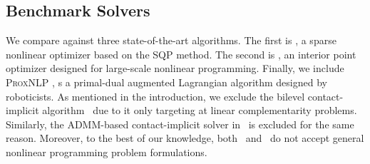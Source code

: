 \subsection{Benchmark Solvers}
We compare  against three state-of-the-art algorithms.
The first is \snopt \cite{SNOPT}, a sparse nonlinear optimizer based on the SQP method. The second is \ipopt \cite{ipopt}, an interior point optimizer designed for large-scale nonlinear programming. Finally, we include \textsc{ProxNLP} \cite{proxNLP}, s a primal-dual augmented Lagrangian algorithm designed by roboticists. As mentioned in the introduction, we exclude the bilevel contact-implicit algorithm~\cite{le2024fast} due to it only targeting at linear complementarity problems. Similarly, the ADMM-based contact-implicit solver in~\cite{aydinoglu2024consensus} is excluded for the same reason. Moreover, to the best of our knowledge, both~\cite{le2024fast} and~\cite{aydinoglu2024consensus} do not accept general nonlinear programming problem formulations.   

